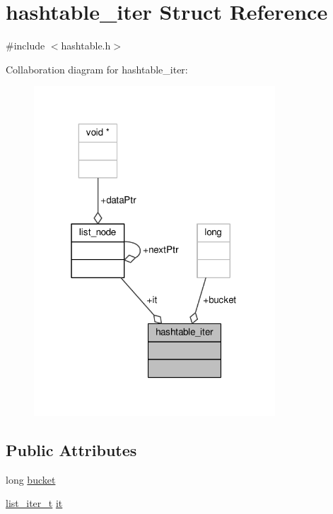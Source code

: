 \hypertarget{structhashtable__iter}{\section{hashtable\-\_\-iter Struct Reference}
\label{structhashtable__iter}
}


{\ttfamily \#include $<$hashtable.\-h$>$}



Collaboration diagram for hashtable\-\_\-iter\-:
\nopagebreak
\begin{figure}[H]
\begin{center}
\leavevmode
\includegraphics[width=256pt]{structhashtable__iter__coll__graph}
\end{center}
\end{figure}
\subsection*{Public Attributes}
\begin{DoxyCompactItemize}
\item 
long \hyperlink{structhashtable__iter_a2c42ac7e9c6cd05149262fcadca30999}{bucket}
\item 
\hyperlink{list_8h_a9c6da8350cc243ef487a7f9686c377e8}{list\-\_\-iter\-\_\-t} \hyperlink{structhashtable__iter_a6c6a6a0cc47771f604365d9ebc1f311d}{it}
\end{DoxyCompactItemize}


